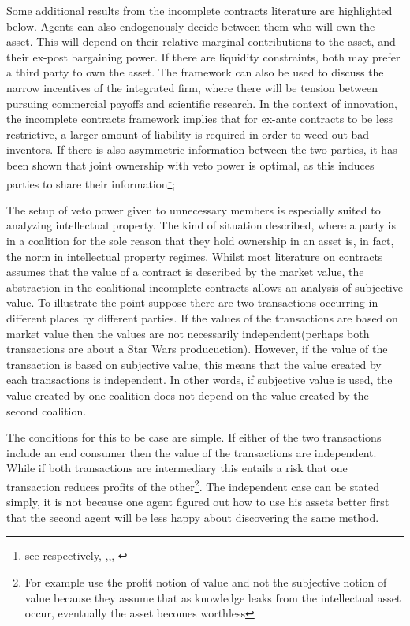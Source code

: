 Some additional results from the incomplete contracts literature are highlighted below. Agents can also endogenously decide between them who will own the asset. This will depend on their relative marginal contributions to the asset, and their ex-post bargaining power. If there are liquidity constraints, both may prefer a third party to own the asset. The framework can also be used to discuss the narrow incentives of the integrated firm, where there will be tension between pursuing commercial payoffs and scientific research. In the context of innovation, the incomplete contracts framework implies that for ex-ante contracts to be less restrictive, a larger amount of liability is required in order to weed out bad inventors. If there is also asymmetric information between the two parties, it has been shown that joint ownership with veto power is optimal, as this induces parties to share their information\footnote{see respectively, \cite{Aghion1994},\citep{lerner2010contractibility},\citep{anton1994expropriation}, \citep{Rosenkranz1999}};

The setup of veto power given to unnecessary members is especially suited to analyzing intellectual property. The kind of situation described, where a party is in a coalition for the sole reason that they hold ownership in an asset is, in fact, the norm in intellectual property regimes. Whilst most literature on contracts assumes that the value of a contract is described by the market value, the abstraction in the coalitional incomplete contracts allows an analysis of subjective value. To illustrate the point suppose there are two transactions occurring in different places by different parties. If the values of the transactions are based on market value then the values are not necessarily independent(perhaps both transactions are about a Star Wars producuction). However, if the value of the transaction is based on subjective value, this means that the value created by each transactions is independent. In other words, if subjective value is used, the value created by one coalition does not depend on the value created by the second coalition. 

The conditions for this to be case are simple. If either of the two transactions include an end consumer then the value of the transactions are independent. While if both transactions are intermediary this entails a risk that one transaction reduces profits of the other\footnote{ For example \cite{anton1994expropriation} use the profit notion of value and not the subjective notion of value because they assume that as knowledge leaks from the intellectual asset occur, eventually the asset becomes worthless}. The independent case can be stated simply, it is not because one agent figured out how to use his assets better first that the second agent will be less happy about discovering the same method. 

